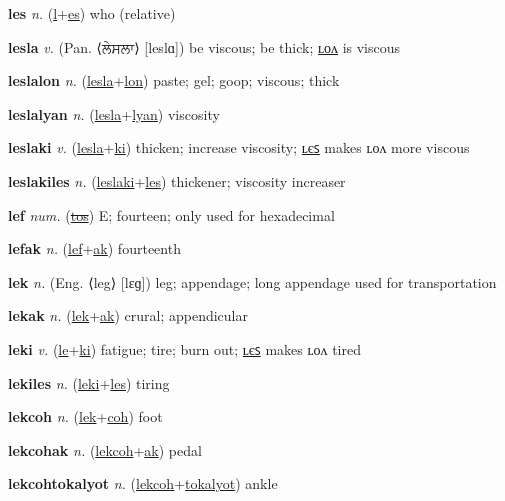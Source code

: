 \textbf{\hypertarget{les}{les}} \textit{n.} (\hyperlink{l}{l}+\allowbreak \hyperlink{es}{es})
who (relative)

\textbf{\hypertarget{lesla}{lesla}} \textit{v.} (Pan. ⟨{\gurmukhi{}ਲੇਸਲਾ}⟩ [leslɑ])
be viscous; be thick; \hyperlink{leslalon}{ʟᴏᴧ} is viscous

\textbf{\hypertarget{leslalon}{leslalon}} \textit{n.} (\hyperlink{lesla}{lesla}+\allowbreak \hyperlink{lon}{lon})
paste; gel; goop; viscous; thick

\textbf{\hypertarget{leslalyan}{leslalyan}} \textit{n.} (\hyperlink{lesla}{lesla}+\allowbreak \hyperlink{lyan}{lyan})
viscosity

\textbf{\hypertarget{leslaki}{leslaki}} \textit{v.} (\hyperlink{lesla}{lesla}+\allowbreak \hyperlink{ki}{ki})
thicken; increase viscosity; \hyperlink{leslakiles}{ʟєꜱ} makes ʟᴏᴧ more viscous

\textbf{\hypertarget{leslakiles}{leslakiles}} \textit{n.} (\hyperlink{leslaki}{leslaki}+\allowbreak \hyperlink{les}{les})
thickener; viscosity increaser

\textbf{\hypertarget{lef}{lef}} \textit{num.} (\hyperlink{tos}{\sout{tos}})
E; fourteen; only used for hexadecimal

\textbf{\hypertarget{lefak}{lefak}} \textit{n.} (\hyperlink{lef}{lef}+\allowbreak \hyperlink{ak}{ak})
fourteenth

\textbf{\hypertarget{lek}{lek}} \textit{n.} (Eng. ⟨leg⟩ [lɛɡ])
leg; appendage; long appendage used for transportation

\textbf{\hypertarget{lekak}{lekak}} \textit{n.} (\hyperlink{lek}{lek}+\allowbreak \hyperlink{ak}{ak})
crural; appendicular

\textbf{\hypertarget{leki}{leki}} \textit{v.} (\hyperlink{le}{le}+\allowbreak \hyperlink{ki}{ki})
fatigue; tire; burn out; \hyperlink{lekiles}{ʟєꜱ} makes ʟᴏᴧ tired

\textbf{\hypertarget{lekiles}{lekiles}} \textit{n.} (\hyperlink{leki}{leki}+\allowbreak \hyperlink{les}{les})
tiring

\textbf{\hypertarget{lekcoh}{lekcoh}} \textit{n.} (\hyperlink{lek}{lek}+\allowbreak \hyperlink{coh}{coh})
foot

\textbf{\hypertarget{lekcohak}{lekcohak}} \textit{n.} (\hyperlink{lekcoh}{lekcoh}+\allowbreak \hyperlink{ak}{ak})
pedal

\textbf{\hypertarget{lekcohtokalyot}{lekcohtokalyot}} \textit{n.} (\hyperlink{lekcoh}{lekcoh}+\allowbreak \hyperlink{tokalyot}{tokalyot})
ankle

